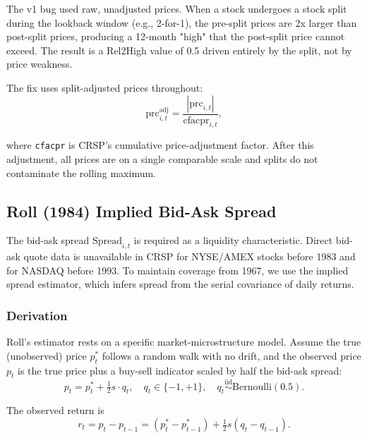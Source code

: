 The v1 bug used raw, unadjusted prices. When a stock undergoes a stock
split during the lookback window (e.g., 2-for-1), the pre-split prices
are 2x larger than post-split prices, producing a 12-month "high" that
the post-split price cannot exceed. The result is a Rel2High value of
0.5 driven entirely by the split, not by price weakness.

The fix uses split-adjusted prices throughout:
\begin{equation}
\mathrm{prc}^{\mathrm{adj}}_{i,t} = \frac{|\mathrm{prc}_{i,t}|}{\mathrm{cfacpr}_{i,t}},
\label{eq:price-adjustment}
\end{equation}

where \texttt{cfacpr} is CRSP's cumulative price-adjustment factor.
After this adjustment, all prices are on a single comparable scale and
splits do not contaminate the rolling maximum.

\subsection{Roll (1984) Implied Bid-Ask Spread}
\label{subsec:stage0-roll}

The bid-ask spread \(\mathrm{Spread}_{i,t}\) is required as a liquidity
characteristic. Direct bid-ask quote data is unavailable in CRSP for
NYSE/AMEX stocks before 1983 and for NASDAQ before 1993. To maintain
coverage from 1967, we use the \cite{Roll1984} implied spread
estimator, which infers spread from the serial covariance of daily
returns.

\subsubsection{Derivation}

Roll's estimator rests on a specific market-microstructure model. Assume
the true (unobserved) price \(p^*_t\) follows a random walk with no
drift, and the observed price \(p_t\) is the true price plus a buy-sell
indicator scaled by half the bid-ask spread:
\begin{equation}
p_t = p^*_t + \tfrac{1}{2} s \cdot q_t,
\quad q_t \in \{-1, +1\},
\quad q_t \stackrel{\mathrm{iid}}{\sim} \text{Bernoulli}(0.5).
\label{eq:roll-model}
\end{equation}

The observed return is
\begin{equation}
r_t = p_t - p_{t-1} = (p^*_t - p^*_{t-1}) + \tfrac{1}{2} s (q_t - q_{t-1}).
\end{equation}

